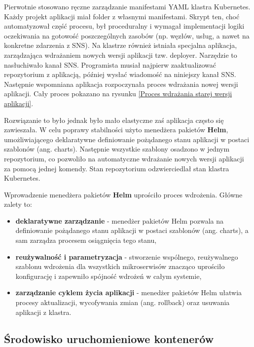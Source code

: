 Pierwotnie stosowano ręczne zarządzanie manifestami YAML klastra Kubernetes. Każdy projekt aplikacji miał folder z własnymi manifestami. Skrypt ten, choć automatyzował część procesu, był proceduralny i wymagał implementacji logiki oczekiwania na gotowość poszczególnych zasobów (np. węzłów, usług, a nawet na konkretne zdarzenia z SNS). Na klastrze również istniała specjalna aplikacja, zarządzająca wdrażaniem nowych wersji aplikacji tzw. deployer. Narzędzie to nasłuchiwało kanał SNS. Programista musiał najpierw zaaktualizować repozytorium z aplikacją, później wysłać wiadomość na niniejszy kanał SNS. Następnie wspomniana aplikacja rozpoczynała proces wdrażania nowej wersji aplikacji. Cały proces pokazano na rysunku \ref{Proces wdrażania starej wersji aplikacji}.


Rozwiązanie to było jednak było mało elastyczne zaś aplikacja często się zawieszała. W celu poprawy stabilności użyto menedżera pakietów \textbf{Helm}, umożliwiającego deklaratywne definiowanie pożądanego stanu aplikacji w postaci szablonów (ang. charts). Następnie wszystkie szablony osadzono w jednym repozytorium, co pozwoliło na automatyczne wdrażanie nowych wersji aplikacji za pomocą jednej komendy. Stan repozytorium odzwierciedlał stan klastra Kubernetes.

\newpage

Wprowadzenie menedżera pakietów \textbf{Helm} uprościło proces wdrożenia. Główne zalety to:
\begin{itemize}
    \item \textbf{deklaratywne zarządzanie} - menedżer pakietów Helm pozwala na definiowanie pożądanego stanu aplikacji w postaci szablonów (ang. charts), a sam zarządza procesem osiągnięcia tego stanu,
    \item \textbf{reużywalność i parametryzacja} - stworzenie wspólnego, reużywalnego szablonu wdrożenia dla wszystkich mikroserwisów znacząco uprościło konfigurację i zapewniło spójność wdrożeń w całym systemie,
    \item \textbf{zarządzanie cyklem życia aplikacji} - menedżer pakietów Helm ułatwia procesy aktualizacji, wycofywania zmian (ang. rollback) oraz usuwania aplikacji z klastra.
\end{itemize}

\subsection{Środowisko uruchomieniowe kontenerów}

